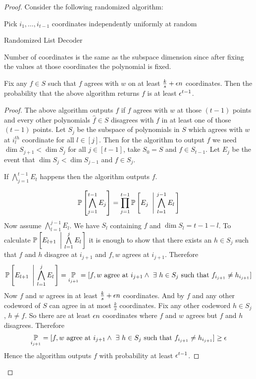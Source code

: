 \begin{proof}
Consider the following randomized algorithm:
\begin{algorithm}
Pick $i_1,\dots, i_{t-1}$ coordinates independently uniformly at random\;
\caption{Randomized List Decoder}
\end{algorithm}
\begin{observation}
    Number of coordinates is the same as the subspace dimension since after fixing the values at those coordinates the polynomial is fixed.
\end{observation}
\begin{claimwidth}
\begin{claim}{}{}
    Fix any $f\in S$ such that $f$ agrees with $w$ on at least $\frac{k}{s}+\epsilon n$ coordinates. Then the probability that the above algorithm returns $f$ is at least $\epsilon^{t-1}$.
\end{claim}
\begin{proof}
The above algorithm outputs $f$ if $f$ agrees with $w$ at those $(t-1)$ points and every other polynomials $\hat{f}\in S$ disagrees with $f$ in at least one of those $(t-1)$ points. Let $S_j$ be the subspace of polynomials in $S$ which agrees with $w$ at $i_l^{th}$ coordinate for all $l\in [j]$.  Then for the algorithm to output $f$ we need $\dim S_{j+1}<\dim S_{j}$ for all $j\in [t-1]$, take $S_0=S$ and $f\in S_{t-1}$.    Let $E_j$ be the event that $\dim S_j<\dim S_{j-1}$ and $f\in S_j$. 
    \begin{observation}
    If $\bigwedge\limits_{j=1}^{t-1} E_t$ happens then the algorithm outputs $f$.
    \end{observation} 
    $$        \mathbb{P}\left[\bigwedge_{j=1}^{t-1} E_j\right] = \prod\limits_{j=1}^{t-1}\mathbb{P}\left[E_j\ \left| \  \bigwedge_{l=1}^{j-1} E_l\right.\right]$$
    Now assume $\bigwedge\limits_{l=1}^{j-1} E_l$. We have $S_l$ containing $f$ and $\dim S_l=t-1-l$. To calculate $\bbP\lt[E_{l+1}\ \lt| \ \bigwedge\limits_{l=1}^j E_l\rt.\rt]$ it is enough to show that there exists an $h\in S_j$ such that $f$ and $h$ disagree at $i_{j+1}$ and $f,w$ agrees at $i_{j+1}$. Therefore $$\bbP\lt[E_{l+1}\ \lt| \ \bigwedge\limits_{l=1}^j E_l\rt.\rt]= \underset{i_{j+1}}{\bbP}=[f,w \text{ agree at $i_{j+1}$}\wedge\ \exs\ h\in S_j\text{ such that $f_{i_{j+1}}\neq h_{i_{j+1}}$}]$$Now $f$ and $w$ agrees in at least $\frac{k}{s}+\epsilon n$ coordinates. And by  $f$ and any other codeword of $S$ can agree in at most $\frac{k}{s}$ coordinates. Fix any other codeword $h\in S_j$, $h\neq f$. So there are at least $\epsilon n$ coordinates where $f$ and $w$ agrees but $f$ and $h$ disagrees. Therefore $$\underset{i_{j+1}}{\mathbb{P}}=[f,w \text{ agree at $i_{j+1}$}\wedge\ \exists\ h\in S_j\text{ such that $f_{i_{j+1}}\neq h_{i_{j+1}}$}]\geq \epsilon$$ Hence the algorithm outputs $f$ with probability at least $\epsilon^{t-1}$. 

\end{proof}
\end{claimwidth}
\end{proof}
